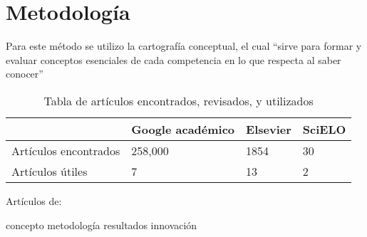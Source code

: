 \section{Metodología}
Para este método se utilizo la cartografía conceptual, el cual “sirve para formar y evaluar conceptos esenciales de cada competencia en lo que respecta al saber conocer” \parencite[][p. 16]{tobon2012} 
\begin{table}[H]
   \caption{Tabla de artículos encontrados, revisados, y utilizados}
   \label{tab:articulos}
      \begin{tabular}{l|l l l}
         \hline
         ~ & Google académico & Elsevier & SciELO\\
         \hline
         Artículos encontrados & 258,000 & 1854 & 30\\
         \hline
         Artículos útiles & 7 & 13 & 2\\
         \hline
      \end{tabular}
\end{table}

Artículos de:

concepto metodología resultados innovación

%


